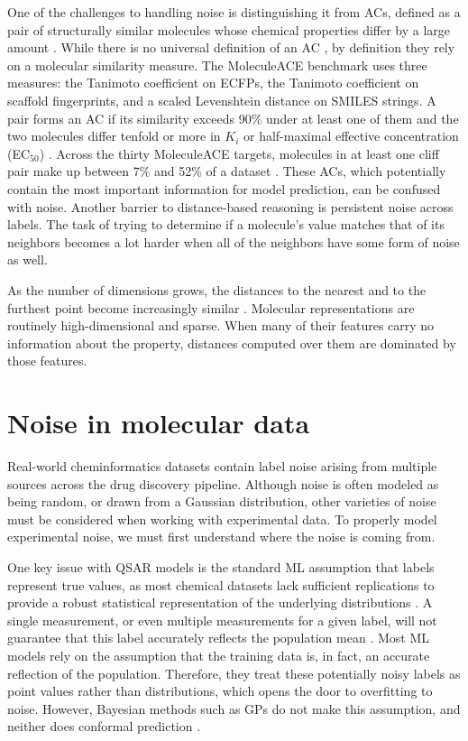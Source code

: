 One of the challenges to handling noise is distinguishing it from ACs, defined as a pair of structurally similar molecules whose chemical properties differ by a large amount \citep{Maggiora2006, Stumpfe2012}. While there is no universal definition of an AC \citep{vanTilborg2022}, by definition they rely on a molecular similarity measure. The MoleculeACE benchmark \citep{vanTilborg2022} uses three measures: the Tanimoto coefficient on ECFPs, the Tanimoto coefficient on scaffold fingerprints, and a scaled Levenshtein distance on SMILES strings. A pair forms an AC if its similarity exceeds 90\% under at least one of them and the two molecules differ tenfold or more in $K_i$ or half-maximal effective concentration (EC$_{50}$) \citep{vanTilborg2022}. Across the thirty MoleculeACE targets, molecules in at least one cliff pair make up between 7\% and 52\% of a dataset \citep{vanTilborg2022}. These ACs, which potentially contain the most important information for model prediction, can be confused with noise. Another barrier to distance-based reasoning is persistent noise across labels. The task of trying to determine if a molecule's value matches that of its neighbors becomes a lot harder when all of the neighbors have some form of noise as well.

As the number of dimensions grows, the distances to the nearest and to the furthest point become increasingly similar \citep{Beyer1999}. Molecular representations are routinely high-dimensional and sparse. When many of their features carry no information about the property, distances computed over them are dominated by those features.

\section{Noise in molecular data}

Real-world cheminformatics datasets contain label noise arising from multiple sources across the drug discovery pipeline. Although noise is often modeled as being random, or drawn from a Gaussian distribution, other varieties of noise must be considered when working with experimental data. To properly model experimental noise, we must first understand where the noise is coming from.

One key issue with QSAR models is the standard ML assumption that labels represent true values, as most chemical datasets lack sufficient replications to provide a robust statistical representation of the underlying distributions \citep{Kolmar2021}. A single measurement, or even multiple measurements for a given label, will not guarantee that this label accurately reflects the population mean \citep{Kolmar2021}. Most ML models rely on the assumption that the training data is, in fact, an accurate reflection of the population. Therefore, they treat these potentially noisy labels as point values rather than distributions, which opens the door to overfitting to noise. However, Bayesian methods such as GPs do not make this assumption, and neither does conformal prediction \citep{Kolmar2021}.

